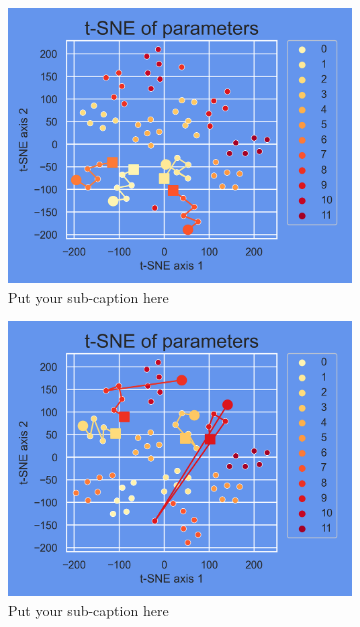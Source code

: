 \begin{figure}[ht]
	\begin{subfigure}{.5\textwidth}
		\centering
		\includegraphics[width=.9\linewidth]{./figs/params_tSNE_0.png}  
		\caption{Put your sub-caption here}
		\label{fig:sub-first}
	\end{subfigure}
	\begin{subfigure}{.5\textwidth}
		\centering
		\includegraphics[width=.9\linewidth]{./figs/params_tSNE_1.png}  
		\caption{Put your sub-caption here}
		\label{fig:sub-second}
	\end{subfigure}
	\begin{subfigure}{.5\textwidth}
		\centering

\end{subfigure}
\end{figure}
